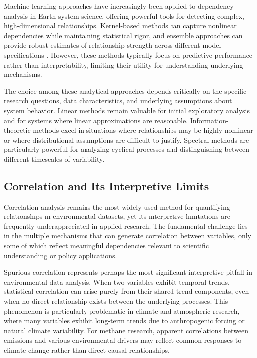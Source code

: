 Machine learning approaches have increasingly been applied to dependency analysis in Earth system science, offering powerful tools for detecting complex, high-dimensional relationships. Kernel-based methods can capture nonlinear dependencies while maintaining statistical rigor, and ensemble approaches can provide robust estimates of relationship strength across different model specifications \cite{Marinazzo2008}. However, these methods typically focus on predictive performance rather than interpretability, limiting their utility for understanding underlying mechanisms.

The choice among these analytical approaches depends critically on the specific research questions, data characteristics, and underlying assumptions about system behavior. Linear methods remain valuable for initial exploratory analysis and for systems where linear approximations are reasonable. Information-theoretic methods excel in situations where relationships may be highly nonlinear or where distributional assumptions are difficult to justify. Spectral methods are particularly powerful for analyzing cyclical processes and distinguishing between different timescales of variability.




\subsection{Correlation and Its Interpretive Limits}

Correlation analysis remains the most widely used method for quantifying relationships in environmental datasets, yet its interpretive limitations are frequently underappreciated in applied research. The fundamental challenge lies in the multiple mechanisms that can generate correlation between variables, only some of which reflect meaningful dependencies relevant to scientific understanding or policy applications.

Spurious correlation represents perhaps the most significant interpretive pitfall in environmental data analysis. When two variables exhibit temporal trends, statistical correlation can arise purely from their shared trend components, even when no direct relationship exists between the underlying processes. This phenomenon is particularly problematic in climate and atmospheric research, where many variables exhibit long-term trends due to anthropogenic forcing or natural climate variability. For methane research, apparent correlations between emissions and various environmental drivers may reflect common responses to climate change rather than direct causal relationships.

